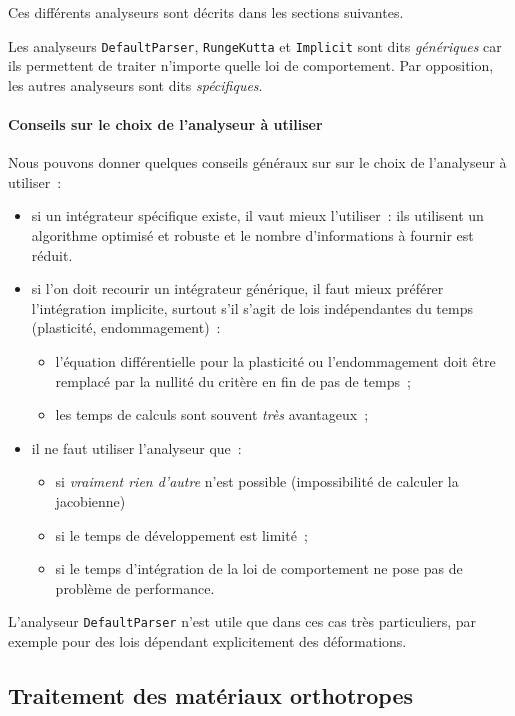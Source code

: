 \documentclass[rectoverso,pleiades,pstricks,leqno,anti]{texmf/note_technique_2010}
\begin{document}
Ces différents analyseurs sont décrits dans les sections suivantes.

Les analyseurs \texttt{DefaultParser}, \texttt{RungeKutta} et
\texttt{Implicit} sont dits {\em génériques} car ils permettent de
traiter n'importe quelle loi de comportement. Par opposition, les autres
analyseurs sont dits {\em spécifiques}.

\paragraph{Conseils sur le choix de l'analyseur à utiliser} Nous pouvons
donner quelques conseils généraux sur sur le choix de l'analyseur à
utiliser~:
\begin{itemize}
  \item si un intégrateur spécifique existe, il vaut mieux l'utiliser~:
  ils utilisent un algorithme optimisé et robuste et le nombre
  d'informations à fournir est réduit.
  \item si l'on doit recourir un intégrateur générique, il faut mieux
  préférer l'intégration implicite, surtout s'il s'agit de lois
  indépendantes du temps (plasticité, endommagement)~:
  \begin{itemize}
    \item l'équation différentielle pour la plasticité ou
    l'endommagement doit être remplacé par la nullité du critère en fin
    de pas de temps~;
    \item les temps de calculs sont souvent {\em très} avantageux~;
  \end{itemize}
  \item il ne faut utiliser l'analyseur  que~:
  \begin{itemize}
    \item si {\em vraiment rien d'autre} n'est possible (impossibilité
    de calculer la jacobienne)
    \item si le temps de développement est limité~;
    \item si le temps d'intégration de la loi de comportement ne pose
    pas de problème de performance.
  \end{itemize}
\end{itemize}

L'analyseur \texttt{DefaultParser} n'est utile que dans ces cas très
particuliers, par exemple pour des lois dépendant explicitement des
déformations.

\subsection{Traitement des matériaux orthotropes}
\end{document}
